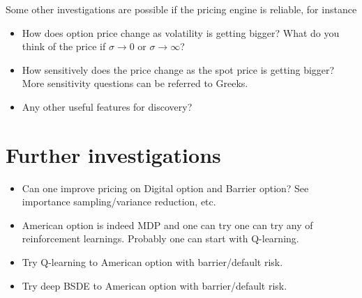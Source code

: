 \documentclass{article}
\begin{document}
Some other investigations are possible if the pricing engine is reliable, for instance
\begin{itemize}
\item How does option price change as volatility is getting bigger?
What do you think of the price if $\sigma\to 0$ or $\sigma\to \infty$?
\item How sensitively does the price change as the spot price is getting bigger? More sensitivity questions can be referred to Greeks.
\item Any other useful features for discovery?
\end{itemize}




\section{Further investigations}

\begin{itemize}
\item Can one improve pricing on Digital option and Barrier option? See importance sampling/variance reduction, etc.
\item American option is indeed MDP and one can try one can try any of reinforcement learnings. Probably one can start with Q-learning.
\item Try Q-learning to American option with barrier/default risk.
\item Try deep BSDE to American option with barrier/default risk. 
\end{itemize}














%
%
%
%
\end{document}
